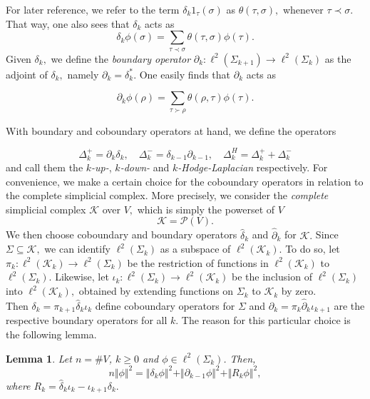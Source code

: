 \documentclass[10pt]{amsart}
\newtheorem{lemma}[theorem]{Lemma}
\theoremstyle{definition}
\newcommand{\K}{\mathcal{K}}
\begin{document}
For later reference, we refer to the term $\delta_k1_\tau(\sigma)$ as $\theta(\tau,\sigma),$ whenever $\tau\prec\sigma.$ That way, one also sees that $\delta_k$ acts as 
\[\delta_k\phi(\sigma) = \sum_{\tau\prec\sigma}\theta(\tau,\sigma)\phi(\tau).\]
Given $\delta_k,$ we define the \textit{boundary operator} $\partial_k:\ell^2(\Sigma_{k+1})\rightarrow\ell^2(\Sigma_{k})$ as the adjoint of $\delta_k,$ namely $\partial_k = \delta_k^*.$ One easily finds that $\partial_k$ acts as

\[\partial_k\phi(\rho) = \sum_{\tau\succ\rho}\theta(\rho,\tau)\phi(\tau).\]

With boundary and coboundary operators at hand, we define the operators

\[\Delta^+_k = \partial_{k}\delta_k,\quad\Delta^-_k = \delta_{k-1}\partial_{k-1},\quad\Delta^H_k = \Delta^+_k+\Delta^-_k\]
and call them the $k$\textit{-up-}, $k$\textit{-down-} and $k$\textit{-Hodge-Laplacian} respectively.
For convenience, we make a certain choice for the coboundary operators in relation to the complete simplicial complex. More precisely, we consider the \textit{complete} simplicial complex $\K$ over $V,$ which is simply the powerset of $V$ \[\K = \mathcal{P}(V).\] We then choose coboundary and boundary operators $\widehat\delta_k$ and $\widehat\partial_k$ for $\K.$ 
Since $\Sigma\subseteq \K,$ we can identify $\ell^2(\Sigma_k)$ as a subspace of $\ell^2(\K_k).$ To do so, let $\pi_k:\ell^2(\K_k)\rightarrow\ell^2(\Sigma_k)$ be the restriction of functions in $\ell^2(\K_k)$ to $\ell^2(\Sigma_k).$ Likewise, let $\iota_k:\ell^2(\Sigma_k)\rightarrow\ell^2(\K_k)$ be the inclusion of $\ell^2(\Sigma_k)$ into $\ell^2(\K_k),$ obtained by extending functions on $\Sigma_k$ to $\K_k$ by zero.
\\
Then $\delta_k = \pi_{k+1}\widehat\delta_k\iota_k$ define coboundary operators for $\Sigma$ and $\partial_k = \pi_k\widehat\partial_k\iota_{k+1}$ are the respective boundary operators for all $k$. The reason for  this particular choice is the following lemma.
\begin{lemma}\label{nId}
    Let $n = \#V$, $k\geq 0$ and $\phi\in\ell^2(\Sigma_k)$. Then, 
    \[n\Vert\phi\Vert^2 = \Vert\delta_k\phi\Vert^2+\Vert\partial_{k-1}\phi\Vert^2+\Vert R_k\phi\Vert^2,\]
    where $R_k = \widehat\delta_k\iota_k-\iota_{k+1}\delta_k.$
\end{lemma}
\end{document}
